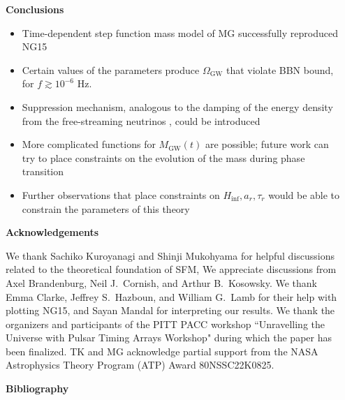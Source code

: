 \documentclass{beamer}                             %
\newcommand{\blocktitle}[1]{{\Large \textbf{#1}}}
\begin{document}
\begin{frame}[t]
\begin{columns}[T]
\begin{column}{0.01\textwidth}
  \begin{center}
    \textcolor{darksilver}{\rule[-1cm]{1mm}{0.8\textheight}}
  \end{center}
\end{column}


\begin{column}{0.30\textwidth}
\begin{tcolorbox}
\blocktitle{Conclusions}
    \begin{itemize}
        \item Time-dependent step function mass model of MG successfully reproduced NG15
        \item Certain values of the parameters produce $\Omega_{\text{GW}}$ that violate BBN bound, for $f \gtrsim 10^{-6}$ Hz.
        \item Suppression mechanism, analogous to the damping of the energy density from the free-streaming neutrinos \cite{Durrer:1997ta}, could be introduced
        \item More complicated functions for $M_{\text{GW}}(t)$ are possible; future work can try to place constraints on the evolution of the mass during phase transition
        \item Further observations that place constraints on $H_{\text{inf}}, a_r, \tau_r$ would be able to constrain the parameters of this theory
    \end{itemize}
  \end{tcolorbox}
  
  \begin{tcolorbox}
    \blocktitle{Acknowledgements}
    
    We thank Sachiko Kuroyanagi and Shinji Mukohyama for helpful discussions related to the theoretical foundation of SFM, \cite{Fujita:2018ehq} We appreciate discussions from Axel Brandenburg, Neil J.\ Cornish, and Arthur B.\ Kosowsky. We thank Emma Clarke, Jeffrey S.\ Hazboun, and William G.\ Lamb for their help with plotting NG15, and Sayan Mandal for interpreting our results. We thank the organizers and participants of the PITT PACC workshop ``Unravelling the Universe with Pulsar Timing Arrays Workshop" during which the paper has been finalized. TK and MG acknowledge partial support from the NASA Astrophysics Theory Program (ATP) Award 80NSSC22K0825.
  \end{tcolorbox}

  \begin{tcolorbox}
    \blocktitle{Bibliography}
       \printbibliography
  \end{tcolorbox}
\end{column}

\end{columns}

\end{frame}
\end{document}
